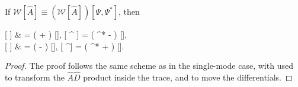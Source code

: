 \begin{theorem}
\label{thm:func-wigner:correspondences}
    If $\mathcal{W} [ \hat{A} ] \equiv (\mathcal{W} [ \hat{A} ]) [\Psi, \Psi^*]$, then
	\begin{eqn*}
		 [ \Psiop {} ]
			& = \left( \Psi +  \frac{\delta}{\delta \Psi^*} \right) ,
		\quad
		 [ \Psiop^\dagger {} ]
			= \left( \Psi^* -  \frac{\delta}{\delta \Psi} \right) , \\
		 [  \Psiop ]
			& = \left( \Psi -  \frac{\delta}{\delta \Psi^*} \right) ,
		\quad
		 [  \Psiop^\dagger ]
			= \left( \Psi^* +  \frac{\delta}{\partial \Psi} \right) .
	\end{eqn*}
\end{theorem}
\begin{proof}
The proof follows the same scheme as in the single-mode case, with  used to transform the $\hat{D}$ product inside the trace, and  to move the differentials.
\end{proof}

